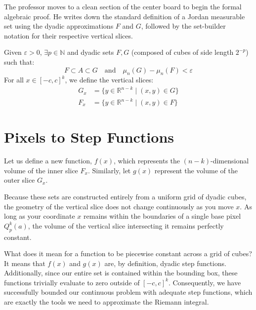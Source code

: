 \begin{ai-note}
The professor moves to a clean section of the center board to begin the formal algebraic proof. He writes down the standard definition of a Jordan measurable set using the dyadic approximations $F$ and $G$, followed by the set-builder notation for their respective vertical slices.
\end{ai-note}

\begin{math-stroke}
Given $\varepsilon > 0$, $\exists p \in \mathbb{N}$ and dyadic sets $F, G$ (composed of cubes of side length $2^{-p}$) such that:
\[
F \subset A \subset G \quad \text{and} \quad \mu_n(G) - \mu_n(F) < \varepsilon
\]
For all $x \in [-c, c]^k$, we define the vertical slices:
\begin{align*}
G_x &= \{ y \in \mathbb{R}^{n-k} \mid (x,y) \in G \} \\
F_x &= \{ y \in \mathbb{R}^{n-k} \mid (x,y) \in F \}
\end{align*}
\end{math-stroke}

\section{Pixels to Step Functions}

\begin{spoken-clean}[18:22 - 21:50]
Let us define a new function, $f(x)$, which represents the $(n-k)$-dimensional volume of the inner slice $F_x$. Similarly, let $g(x)$ represent the volume of the outer slice $G_x$. 

Because these sets are constructed entirely from a uniform grid of dyadic cubes, the geometry of the vertical slice does not change continuously as you move $x$. As long as your coordinate $x$ remains within the boundaries of a single base pixel $Q_p^k(a)$, the volume of the vertical slice intersecting it remains perfectly constant. 

What does it mean for a function to be piecewise constant across a grid of cubes? It means that $f(x)$ and $g(x)$ are, by definition, dyadic step functions. Additionally, since our entire set is contained within the bounding box, these functions trivially evaluate to zero outside of $[-c, c]^k$. Consequently, we have successfully bounded our continuous problem with adequate step functions, which are exactly the tools we need to approximate the Riemann integral.
\end{spoken-clean}

